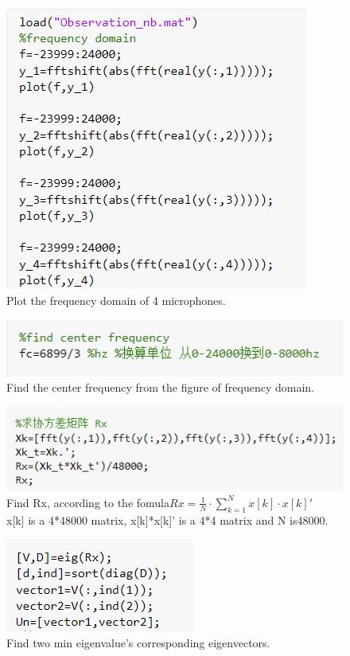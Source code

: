 \documentclass{report}
\begin{document}
\begin{figure}
\includegraphics[scale=0.7]{code fre domain}
\\Plot the frequency domain of 4 microphones.
\end{figure}

\begin{figure}
\includegraphics[scale=0.7]{code center fre}
\\Find the center frequency from the figure of frequency domain.
\end{figure}

\begin{figure}
\includegraphics[scale=0.7]{code Rx}
\\Find Rx, according to the fomula$Rx=\frac{1}{N} \cdot \sum_{k=1}^{N}{x[k] \cdot x[k]'}$
\\x[k] is a 4*48000 matrix, x[k]*x[k]' is a 4*4 matrix and N is48000.
\end{figure}

\begin{figure}
\includegraphics[scale=0.7]{code eigenvector}
\\Find two min eigenvalue's corresponding eigenvectors.
\end{figure}
\end{document}
